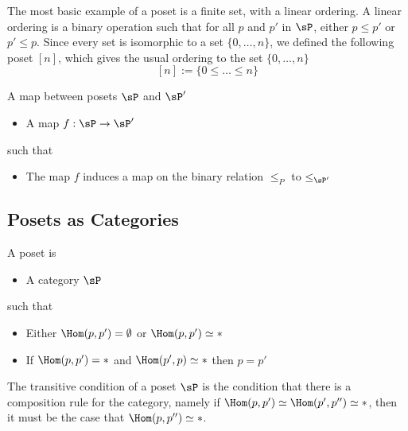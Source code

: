 \documentclass[reqno]{amsart}
\begin{document}
\begin{example}
The most basic example of a poset is a finite set, with a linear ordering. A linear ordering is a binary operation such that for all $p$ and $p'$ in $\sP$, either $p\leq p'$ or $p'\leq p$. Since every set is isomorphic to a set $\{0,\dots, n\}$, we defined the following poset $[n]$, which gives the usual ordering to the set $\{0,\dots, n\}$ 
\[
[n]:=\{0\leq \dots \leq n\}
\]
\end{example}

\begin{definition}
A map between posets $\sP$ and $\sP'$ 
\begin{itemize}[label =+)]
	\item A map $f:\sP\rightarrow \sP'$
\end{itemize}
	such that 
	\begin{itemize}[label = -)]
	\item The map $f$ induces a map on the binary relation $\leq_{P}$ to $\leq_{\sP'}$
	\end{itemize}
\end{definition}


\subsection{Posets as Categories}

\begin{definition}[Poset]
	A poset is 
	\begin{itemize}[label=+)]
	\item A category $\sP$	
	\end{itemize}
	
	such that 
	\begin{itemize}[label=-)]
	\item 	Either $\Hom(p,p')=\emptyset$ or $\Hom(p,p')\simeq\ast$
	\item If $\Hom(p,p')=\ast$ and  $\Hom(p',p)\simeq \ast$ then $p=p'$
	\end{itemize}
\end{definition}
	
	
	
	
	\begin{remark}
	The transitive condition of a poset $\sP$ is the condition that there is a composition rule for the category, namely if $\Hom(p,p')\simeq \Hom(p',p'')\simeq \ast$, then it must be the case that $\Hom(p,p'')\simeq \ast$. 
\end{remark}









%
\end{document}
